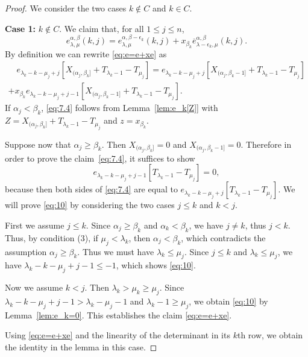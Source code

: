 \documentclass[12pt]{amsart}
\numberwithin{equation}{section}
\theoremstyle{definition}
\newcommand\ove{\overline{e}}
\begin{document}
\begin{proof}
We consider the two cases $k\notin C$ and $k\in C$.

\textbf{Case 1:} $k\not\in C$. We claim that, for all $1\le j\le n$,
\begin{equation}\label{eq:e=e+xe}
  e_{\lambda,\mu}^{\alpha,\beta}(k,j)
  =e_{\lambda,\mu}^{\alpha,\beta-\epsilon_k}(k,j)
  +x_{\beta_k} \ove_{\lambda-\epsilon_k,\mu}^{\alpha,\beta}(k,j).
\end{equation}
By definition we can rewrite \eqref{eq:e=e+xe} as
\begin{multline}\label{eq:7.4}
\quad  e_{\lambda_k-k-\mu_j+j}[X_{(\alpha_j,\beta_k]}+T_{\lambda_k-1}-T_{\mu_j}]
  = e_{\lambda_k-k-\mu_j+j}[X_{(\alpha_j,\beta_k-1]}+T_{\lambda_k-1}-T_{\mu_j}]\\
  + x_{\beta_k}
  e_{\lambda_k-k-\mu_j+j-1}[X_{(\alpha_j,\beta_k-1]}+T_{\lambda_k-1}-T_{\mu_j}].
\end{multline}
If $\alpha_j<\beta_k$, \eqref{eq:7.4} follows from Lemma~\ref{lem:e_k[Z]} with
$Z=X_{(\alpha_j,\beta_k]}+T_{\lambda_k-1}-T_{\mu_j}$ and $z=x_{\beta_k}$.

Suppose now that $\alpha_j\ge \beta_k$. Then $X_{(\alpha_j, \beta_k]} = 0$ and
$X_{(\alpha_j, \beta_k-1]} = 0$. Therefore in order to prove the
claim~\eqref{eq:7.4}, it suffices to show
\begin{equation}
  \label{eq:10}
 e_{\lambda_k-k-\mu_j+j-1}[T_{\lambda_k-1}-T_{\mu_j}] = 0,
\end{equation}
because then both sides of \eqref{eq:7.4} are equal to
$e_{\lambda_k-k-\mu_j+j}[T_{\lambda_k-1}-T_{\mu_j}]$. We will prove
\eqref{eq:10} by considering the two cases $j\le k$ and $k<j$.

First we assume $j\le k$. Since $\alpha_j\ge \beta_k$ and $\alpha_k<\beta_k$, we
have $j\ne k$, thus $j<k$. Thus, by condition (3), if $\mu_j<\lambda_k$, then
$\alpha_j<\beta_k$, which contradicts the assumption $\alpha_j\ge \beta_k$. Thus
we must have $\lambda_k\le \mu_j$. Since $j\le k$ and $\lambda_k\le \mu_j$, we
have $\lambda_k-k-\mu_j+j-1 \le -1$, which shows \eqref{eq:10}.

Now we assume $k<j$. Then $\lambda_k>\mu_k\ge\mu_j$. Since
$\lambda_k-k-\mu_j+j-1>\lambda_k-\mu_j-1$ and $\lambda_{k}-1\ge \mu_j$, we
obtain \eqref{eq:10} by Lemma~\ref{lem:e_k=0}. This establishes the claim
\eqref{eq:e=e+xe}.

Using \eqref{eq:e=e+xe} and the linearity of the determinant in its $k$th row,
we obtain the identity in the lemma in this case.


\end{proof}
\end{document}
